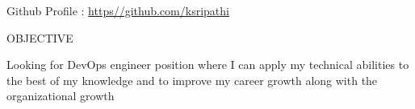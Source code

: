 \documentclass{resume} %
\newcommand{\blank}[1]{\hspace*{#1}}
\begin{document}
\blank{5 cm}
{Github Profile : }
\url{https//github.com/ksripathi}

\begin{rSection}{OBJECTIVE}
  
  { Looking for DevOps engineer position where I can apply my technical
    abilities to the best of my knowledge and to improve my career growth along
    with the organizational growth }


\end{rSection}

\end{document}
